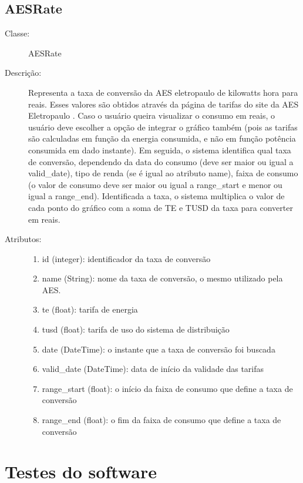 \section{AESRate}
\begin{description}
  \item[Classe:] AESRate
  \item[Descrição:] Representa a taxa de conversão da AES eletropaulo de kilowatts hora para reais. Esses valores são obtidos através da página de tarifas do site da AES Eletropaulo \cite{aes_site}. Caso o usuário queira visualizar o consumo em reais, o usuário deve escolher a opção de integrar o gráfico também (pois as tarifas são calculadas em função da energia consumida, e não em função potência consumida em dado instante). Em seguida, o sistema identifica qual taxa de conversão, dependendo da data do consumo (deve ser maior ou igual a valid\_date), tipo de renda (se é igual ao atributo name), faixa de consumo (o valor de consumo deve ser maior ou igual a range\_start e menor ou igual a range\_end). Identificada a taxa, o sistema multiplica o valor de cada ponto do gráfico com a soma de TE e TUSD da taxa para converter em reais.
  \item[Atributos:] \hfill
    \begin{enumerate}
      \item id (integer): identificador da taxa de conversão
      \item name (String): nome da taxa de conversão, o mesmo utilizado pela AES.
      \item te (float): tarifa de energia
      \item tusd (float): tarifa de uso do sistema de distribuição
      \item date (DateTime): o instante que a taxa de conversão foi buscada
      \item valid\_date (DateTime): data de início da validade das tarifas
      \item range\_start (float): o início da faixa de consumo que define a taxa de conversão
        \item range\_end (float): o fim da faixa de consumo que define a taxa de conversão
    \end{enumerate}
\end{description} 

\chapter{Testes do software}
\label{apendice_software_tests}
